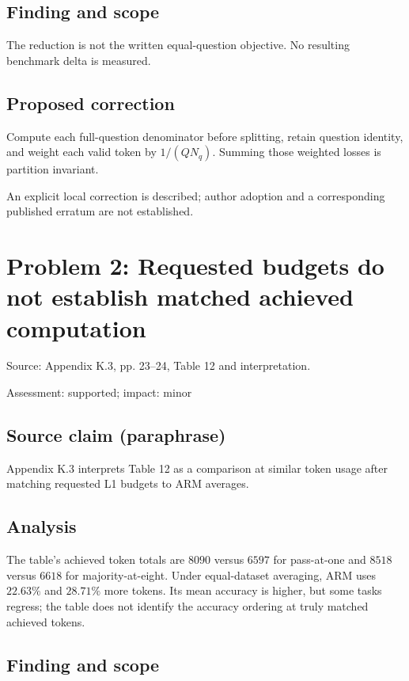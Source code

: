 \documentclass[11pt]{article}
\begin{document}
\subsection*{Finding and scope}

The reduction is not the written equal-question objective. No resulting benchmark delta is measured.

\subsection*{Proposed correction}

Compute each full-question denominator before splitting, retain question identity, and weight each valid token by \(1/(QN_q)\). Summing those weighted losses is partition invariant.

An explicit local correction is described; author adoption and a corresponding published erratum are not established.

\section*{Problem 2: Requested budgets do not establish matched achieved computation}

Source: Appendix K.3, pp. 23–24, Table 12 and interpretation.

Assessment: supported; impact: minor

\subsection*{Source claim (paraphrase)}

Appendix K.3 interprets Table 12 as a comparison at similar token usage after matching requested L1 budgets to ARM averages.

\subsection*{Analysis}

The table’s achieved token totals are \(8090\) versus \(6597\) for pass-at-one and \(8518\) versus \(6618\) for majority-at-eight. Under equal-dataset averaging, ARM uses \(22.63\%\) and \(28.71\%\) more tokens. Its mean accuracy is higher, but some tasks regress; the table does not identify the accuracy ordering at truly matched achieved tokens.

\subsection*{Finding and scope}
\end{document}

